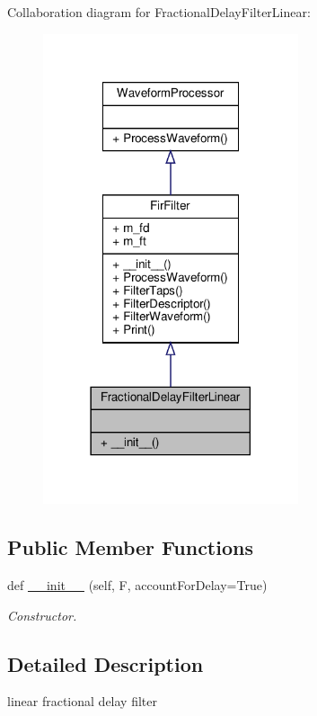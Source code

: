 Collaboration diagram for Fractional\+Delay\+Filter\+Linear\+:
\nopagebreak
\begin{figure}[H]
\begin{center}
\leavevmode
\includegraphics[width=213pt]{classSignalIntegrity_1_1TimeDomain_1_1Filters_1_1InterpolatorLinear_1_1FractionalDelayFilterLinear__coll__graph}
\end{center}
\end{figure}
\subsection*{Public Member Functions}
\begin{DoxyCompactItemize}
\item 
def \hyperlink{classSignalIntegrity_1_1TimeDomain_1_1Filters_1_1InterpolatorLinear_1_1FractionalDelayFilterLinear_a71162faa904c7ea2018b89ebba16c33d}{\+\_\+\+\_\+init\+\_\+\+\_\+} (self, F, account\+For\+Delay=True)
\begin{DoxyCompactList}\small\item\em Constructor. \end{DoxyCompactList}\end{DoxyCompactItemize}


\subsection{Detailed Description}
linear fractional delay filter 

